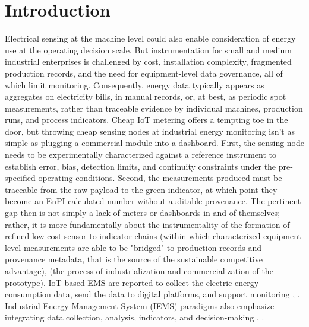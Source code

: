 \documentclass[technologies,article,submit,pdftex,moreauthors]{Definitions/mdpi}
\begin{document}
\section{Introduction}
\label{sec:introduction}

Electrical sensing at the machine level could also enable consideration of energy use at the operating decision scale. But instrumentation for small and medium industrial enterprises is challenged by cost, installation complexity, fragmented production records, and the need for equipment-level data governance, all of which limit monitoring. Consequently, energy data typically appears as aggregates on electricity bills, in manual records, or, at best, as periodic spot measurements, rather than traceable evidence by individual machines, production runs, and process indicators. Cheap IoT metering offers a tempting toe in the door, but throwing cheap sensing nodes at industrial energy monitoring isn’t as simple as plugging a commercial module into a dashboard. First, the sensing node needs to be experimentally characterized against a reference instrument to establish error, bias, detection limits, and continuity constraints under the pre-specified operating conditions. Second, the measurements produced must be traceable from the raw payload to the green indicator, at which point they become an EnPI-calculated number without auditable provenance. The pertinent gap then is not simply a lack of meters or dashboards in and of themselves; rather, it is more fundamentally about the instrumentality of the formation of refined low-cost sensor-to-indicator chains (within which characterized equipment-level measurements are able to be "bridged" to production records and provenance metadata, that is the source of the sustainable competitive advantage), (the process of industrialization and commercialization of the prototype). IoT-based EMS are reported to collect the electric energy consumption data, send the data to digital platforms, and support monitoring \cite{ref1}, \cite{ref4}. Industrial Energy Management System (IEMS) paradigms also emphasize integrating data collection, analysis, indicators, and decision-making \cite{ref2}, \cite{ref3}. 
\end{document}
